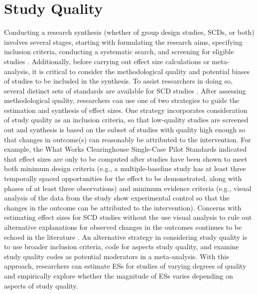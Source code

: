 \documentclass[
]{book}
\begin{document}
\hypertarget{study-quality}{%
\section{Study Quality}\label{study-quality}}

Conducting a research synthesis (whether of group design studies, SCDs, or both) involves several stages, starting with formulating the research aims, specifying inclusion criteria, conducting a systematic search, and screening for eligible studies \citep{cooper2010Research, pustejovsky2017Research}.
Additionally, before carrying out effect size calculations or meta-analysis, it is critical to consider the methodological quality and potential biases of studies to be included in the synthesis.
To assist researchers in doing so, several distinct sets of standards are available for SCD studies \citep[e.g.,][]{kratochwill2013SingleCase, reichow2018Development, tate2016SingleCase, zimmerman2018Singlecase}.
After assessing methodological quality, researchers can use one of two strategies to guide the estimation and synthesis of effect sizes.
One strategy incorporates consideration of study quality as an inclusion criteria, so that low-quality studies are screened out and synthesis is based on the subset of studies with quality high enough so that changes in outcome(s) can reasonably be attributed to the intervention.
For example, the What Works Clearinghouse Single-Case Pilot Standards \citep{Kratochwill2010single} indicated that effect sizes are only to be computed after studies have been shown to meet both minimum design criteria (e.g., a multiple-baseline study has at least three temporally spaced opportunities for the effect to be demonstrated, along with phases of at least three observations) and minimum evidence criteria (e.g., visual analysis of the data from the study show experimental control so that the changes in the outcome can be attributed to the intervention).
Concerns with estimating effect sizes for SCD studies without the use visual analysis to rule out alternative explanations for observed changes in the outcomes continues to be echoed in the literature \citep{kratochwill2021Singlecase, maggin2021Commentary}.
An alternative strategy in considering study quality is to use broader inclusion criteria, code for aspects study quality, and examine study quality codes as potential moderators in a meta-analysis.
With this approach, researchers can estimate ESs for studies of varying degrees of quality and empirically explore whether the magnitude of ESs varies depending on aspects of study quality.
\end{document}
